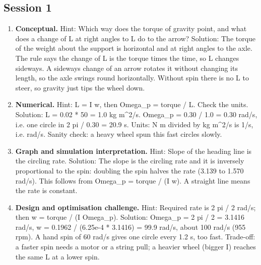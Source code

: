 \documentclass[11pt,a4paper]{article}
\begin{document}
\subsection*{Session 1}
\begin{enumerate}[nosep]
\item \textbf{Conceptual.} Hint: Which way does the torque of gravity point, and what does a change of L at right angles to L do to the arrow? Solution: The torque of the weight about the support is horizontal and at right angles to the axle. The rule says the change of L is the torque times the time, so L changes sideways. A sideways change of an arrow rotates it without changing its length, so the axle swings round horizontally. Without spin there is no L to steer, so gravity just tips the wheel down.
\item \textbf{Numerical.} Hint: L = I w, then Omega\_p = torque / L. Check the units. Solution: L = 0.02 * 50 = 1.0 kg m\textasciicircum{}2/s. Omega\_p = 0.30 / 1.0 = 0.30 rad/s, i.e. one circle in 2 pi / 0.30 = 20.9 s. Units: N m divided by kg m\textasciicircum{}2/s is 1/s, i.e. rad/s. Sanity check: a heavy wheel spun this fast circles slowly.
\item \textbf{Graph and simulation interpretation.} Hint: Slope of the heading line is the circling rate. Solution: The slope is the circling rate and it is inversely proportional to the spin: doubling the spin halves the rate (3.139 to 1.570 rad/s). This follows from Omega\_p = torque / (I w). A straight line means the rate is constant.
\item \textbf{Design and optimisation challenge.} Hint: Required rate is 2 pi / 2 rad/s; then w = torque / (I Omega\_p). Solution: Omega\_p = 2 pi / 2 = 3.1416 rad/s, w = 0.1962 / (6.25e-4 * 3.1416) = 99.9 rad/s, about 100 rad/s (955 rpm). A hand spin of 60 rad/s gives one circle every 1.2 s, too fast. Trade-off: a faster spin needs a motor or a string pull; a heavier wheel (bigger I) reaches the same L at a lower spin.
\end{enumerate}
\end{document}
